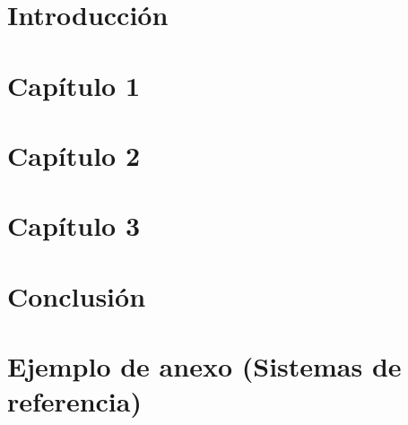 \documentclass[12pt, twoside, openright]{report}
\theoremstyle{definition}
\numberwithin{equation}{chapter}
\begin{document}
\cleardoublepage


\pagestyle{fancy}
\setcounter{page}{1}	
\onehalfspacing		
\chapter{Introducción}
	\label{chap:intro}
	
	
\chapter{Capítulo 1}
	\label{chap:2}
	
	
\chapter{Capítulo 2}
	\label{chap:3}
	

\chapter{Capítulo 3}
	\label{chap:4}
	

\chapter{Conclusión}
	\label{chap:conclusiones}
	
	
\appendix
\chapter{Ejemplo de anexo (Sistemas de referencia)}
	\label{chap:ap_ref_sys}
	
	
\nocite{*}

\end{document}
